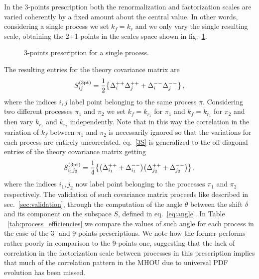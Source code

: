 %
In the 3-points prescription both the renormalization and factorization scales are varied coherently by a fixed amount about the
central value.
In other words, considering a single process we set $k_f=k_r$ and we only vary the single resulting scale, obtaining the
2+1 points in the scales space shown in fig.~\ref{fig:3-points}.
\begin{figure}[t]
    \centering
    {}\qquad
    \begin{caption}{3-points prescription for a single process.}
      \label{fig:3-points}
    \end{caption}
\end{figure}
The resulting entries for the theory covariance matrix are 
\begin{align}
    \label{3S}
    S^{(\rm 3pt)}_{ij} = \frac{1}{2}\big\{ \Delta_i^{++}\Delta_j^{++}  + \Delta_i^{--}\Delta_j^{--}\big\} \, ,
\end{align}
where the indices $i,j$ label point belonging to the same process $\pi$.
Considering two different processes $\pi_1$ and $\pi_2$ we set $k_f=k_{r_1}$ for $\pi_1$ and $k_f=k_{r_1}$ for $\pi_2$
and then vary $k_{r_1}$ and $k_{r_2}$ independently. Note that in this way the correlation in the variation of $k_f$
between $\pi_1$ and $\pi_2$ is necessarily ignored so that the variations for each process are entirely uncorrelated.
eq.~\eqref{3S} is generalized to the off-diagonal entries of the theory covariance matrix getting
\begin{equation}
    S^{(\rm 3pt)}_{i_1j_2} = 
    \frac{1}{4}\big\{\big(\Delta_{i_1}^{++} + \Delta_{i_1}^{--} \big) \big(\Delta_{j_2}^{++} + \Delta_{j_2}^{--} \big) \big\}\, ,
\end{equation}
where the indices $i_1,j_2$ now label point belonging to the processes $\pi_1$ and $\pi_2$ respectively.
The validation of such covariance matrix proceeds like described in sec.~\ref{sec:validation},
through the computation of the angle $\theta$ between the shift $\delta$ and its component on the
subspace $S$, defined in eq.~\eqref{eq:angle}. In Table ~\ref{tab:process_efficiencies} 
we compare the values of such angle for each process in the case of the 3- and 9-points prescriptions.
We note how the former performs rather poorly in comparison to the 9-points one,
suggesting that the lack of correlation in the factorization scale between processes in this prescription
implies that much of the correlation pattern in the MHOU due to universal PDF evolution has been missed.
\begin{table}[ht!]
	\centering
	\small
	
        \vspace{3mm}
	\caption{Comparison between the $\theta$ values for the 3- and 9-points prescriptions.}
	\label{tab:process_efficiencies}
\end{table}

